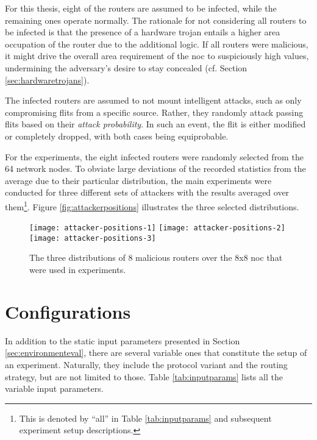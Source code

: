 For this thesis, eight of the routers are assumed to be infected, while the remaining ones operate normally. The rationale for not considering all
routers to be infected is that the presence of a hardware trojan entails a higher area occupation of the router due to the additional logic. If all
routers were malicious, it might drive the overall area requirement of the \gls{noc} to suspiciously high values, undermining the adversary's desire
to stay concealed (cf. Section \ref{sec:hardwaretrojans}).

The infected routers are assumed to not mount intelligent attacks, such as only compromising flits from a specific source. Rather, they randomly
attack passing flits based on their \textit{attack probability}. In such an event, the flit is either modified or completely dropped, with both cases
being equiprobable.

For the experiments, the eight infected routers were randomly selected from the 64 network nodes. To obviate large deviations of the recorded
statistics from the average due to their particular distribution, the main experiments were conducted for three different sets of attackers with the
results averaged over them\footnote{This is denoted by \enquote{all} in Table \ref{tab:inputparams} and subsequent experiment setup descriptions.}.
Figure \vref{fig:attackerpositions} illustrates the three selected distributions.

\begin{figure}
    \texttt{[image: attacker-positions-1]}\hfill
    \texttt{[image: attacker-positions-2]}\hfill
    \texttt{[image: attacker-positions-3]}
    \caption[Malicious router distributions]{The three distributions of 8 malicious routers over the 8x8 \gls{noc} that were used in experiments.}
    \label{fig:attackerpositions}
\end{figure}

\section{Configurations}\label{sec:configurations}
In addition to the static input parameters presented in Section \ref{sec:environmenteval}, there are several variable ones that constitute the setup
of an experiment. Naturally, they include the protocol variant and the routing strategy, but are not limited to those. Table \vref{tab:inputparams}
lists all the variable input parameters.

